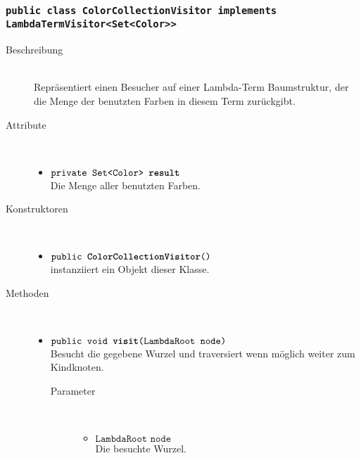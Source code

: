 \subsubsection{\normalfont \texttt{public class \textbf{ColorCollectionVisitor} implements LambdaTermVisitor<Set<Color>{}>}}

\begin{description}
\item[Beschreibung] \hfill \\ Repräsentiert einen Besucher auf einer Lambda-Term Baumstruktur, der die Menge der benutzten Farben in diesem Term zurückgibt.

\item[Attribute] \hfill \\
	\vspace{-.8cm}
	\begin{itemize}
		\item $\texttt{private Set<Color> \textbf{result}}$ \\ Die Menge aller benutzten Farben.
	\end{itemize}

\item[Konstruktoren] \hfill \\
	\vspace{-.8cm}
	\begin{itemize}
		\item $\texttt{public \textbf{ColorCollectionVisitor}()}$ \\ instanziiert ein Objekt dieser Klasse.
	\end{itemize}

\item[Methoden] \hfill \\
	\vspace{-.8cm}
	\begin{itemize}
		\item $\texttt{public void \textbf{visit}(LambdaRoot node)}$ \\ Besucht die gegebene Wurzel und traversiert wenn möglich weiter zum Kindknoten.
		\begin{description}
			\item[Parameter] \hfill \\
			\vspace{-.8cm}
			\begin{itemize}
				\item $\texttt{LambdaRoot node}$ \\ Die besuchte Wurzel.
			\end{itemize}
		\end{description}
				

\end{itemize}
\end{description}
